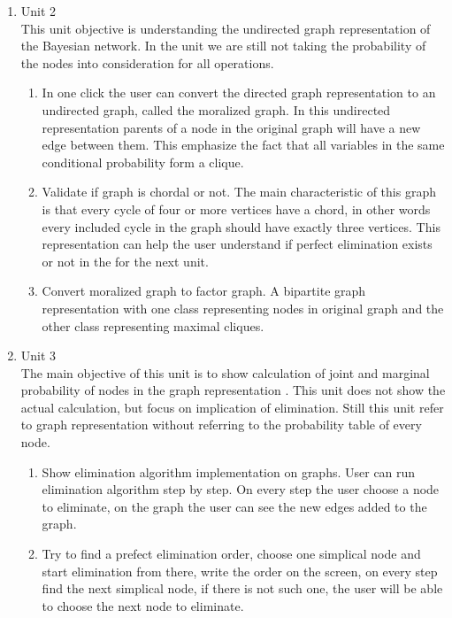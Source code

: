 \documentclass{article}
\begin{document}
\begin{enumerate}
        \item Unit 2\\
        This unit objective is understanding the undirected graph representation of the Bayesian network. In the unit we are still not taking the probability of the nodes into consideration for all operations. 
        \begin{enumerate}
            \item 
             In one click the user can convert the directed graph representation to an undirected graph, called the moralized graph. In this undirected representation parents of a node in the original graph will have a new edge between them. This emphasize the fact that all variables in the same conditional probability form a clique.
            \item Validate if graph is chordal or not. The main characteristic of this graph is that every cycle of four or more vertices have a chord, in other words every included cycle in the graph should have exactly three vertices. This representation can help the user understand if perfect elimination exists or not in the for the next unit.
            \item Convert moralized graph to factor graph. A bipartite graph representation with one class representing nodes in original graph and the other class representing maximal cliques.
        \end{enumerate}
        \item Unit 3\\
            The main objective of this unit is to show calculation of joint and marginal probability of nodes in the graph representation . This unit does not show the actual calculation, but focus on implication of elimination. Still this unit refer to graph representation without referring to the probability table of every node.
        \begin{enumerate}
            \item Show elimination algorithm implementation on graphs. User can run elimination algorithm step by step. On every step the user choose a node to eliminate, on the graph the user can see the new edges added to the graph.
            \item Try to find a prefect elimination order, choose one simplical node and start elimination from there, write the order on the screen, on every step find the next simplical node, if there is not such one, the user will be able to choose the next node to eliminate.
        \end{enumerate}

\end{enumerate}
\end{document}
